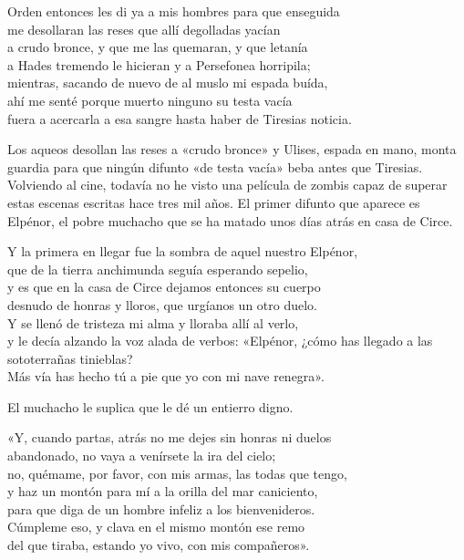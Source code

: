 \begin{versocita}
Orden entonces les di ya a mis hombres para que enseguida\\
me desollaran las reses que allí degolladas yacían\\
a crudo bronce, y que me las quemaran, y que letanía\\
a Hades tremendo le hicieran y a Persefonea horripila;\\
mientras, sacando de nuevo de al muslo mi espada buída,\\
ahí me senté porque muerto ninguno su testa vacía\\
fuera a acercarla a esa sangre hasta haber de Tiresias noticia.
\end{versocita}

Los aqueos desollan las reses a «crudo bronce» y Ulises, espada en mano, monta guardia para que ningún difunto «de testa vacía» beba antes que Tiresias. Volviendo al cine, todavía no he visto una película de zombis capaz de superar estas escenas escritas hace tres mil años. El primer difunto que aparece es Elpénor, el pobre muchacho que se ha matado unos días atrás en casa de Circe.

\begin{versocita}
Y la primera en llegar fue la sombra de aquel nuestro Elpénor,\\
que de la tierra anchimunda seguía esperando sepelio,\\
y es que en la casa de Circe dejamos entonces su cuerpo\\
desnudo de honras y lloros, que urgíanos un otro duelo.\\
Y se llenó de tristeza mi alma y lloraba allí al verlo,\\
y le decía alzando la voz alada de verbos:
\stanzabreak
«Elpénor, ¿cómo has llegado a las sototerrañas tinieblas?\\
Más vía has hecho tú a pie que yo con mi nave renegra».
\end{versocita}

El muchacho le suplica que le dé un entierro digno.

\begin{versocita}
«Y, cuando partas, atrás no me dejes sin honras ni duelos\\
abandonado, no vaya a venírsete la ira del cielo;\\
no, quémame, por favor, con mis armas, las todas que tengo,\\
y haz un montón para mí a la orilla del mar caniciento,\\
para que diga de un hombre infeliz a los bienvenideros.\\
Cúmpleme eso, y clava en el mismo montón ese remo\\
del que tiraba, estando yo vivo, con mis compañeros».
\end{versocita}

